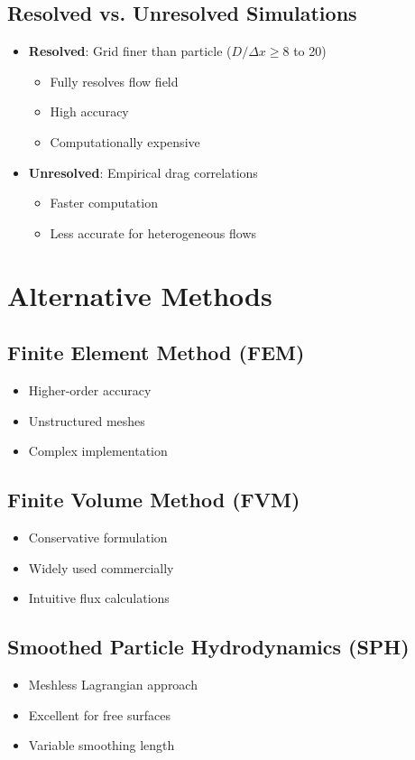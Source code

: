 \subsection{Resolved vs. Unresolved Simulations}
\begin{itemize}
    \item \textbf{Resolved}: Grid finer than particle ($D/\Delta x \geq 8$ to 20)
    \begin{itemize}
        \item Fully resolves flow field
        \item High accuracy
        \item Computationally expensive
    \end{itemize}
    \item \textbf{Unresolved}: Empirical drag correlations
    \begin{itemize}
        \item Faster computation
        \item Less accurate for heterogeneous flows
    \end{itemize}
\end{itemize}

\section{Alternative Methods}

\subsection{Finite Element Method (FEM)}
\begin{itemize}
    \item Higher-order accuracy
    \item Unstructured meshes
    \item Complex implementation
\end{itemize}

\subsection{Finite Volume Method (FVM)}
\begin{itemize}
    \item Conservative formulation
    \item Widely used commercially
    \item Intuitive flux calculations
\end{itemize}

\subsection{Smoothed Particle Hydrodynamics (SPH)}
\begin{itemize}
    \item Meshless Lagrangian approach
    \item Excellent for free surfaces
    \item Variable smoothing length
\end{itemize}

